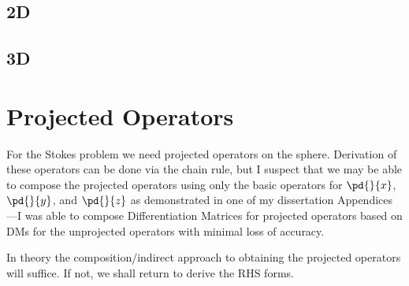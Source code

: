 \documentclass[11pt]{report}
\begin{document}
{\subsection{2D}

\subsection{3D}


\section{Projected Operators}

For the Stokes problem we need projected operators on the sphere. Derivation of these operators can be done via the chain rule, but I suspect that we may be able to compose the projected operators using only the basic operators for $\pd{}{x}$,  $\pd{}{y}$, and $\pd{}{z}$ as demonstrated in one of my dissertation Appendices---I was able to compose Differentiation Matrices for projected operators based on DMs for the unprojected operators with minimal loss of accuracy. 

In theory the composition/indirect approach to obtaining the projected operators will suffice. If not, we shall return to derive the RHS forms. 


}

%
%

\ifstandalone


\end{document}
